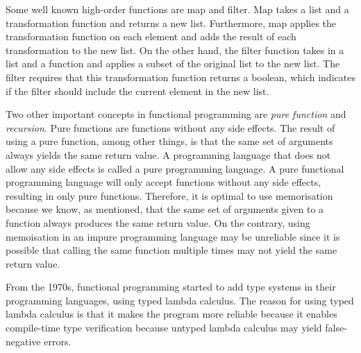 \para
Some well known high-order functions are map and filter. Map takes a list and a transformation function and returns a new list. Furthermore, map applies the transformation function on each element and adds the result of each transformation to the new list. On the other hand, the filter function takes in a list and a function and applies a subset of the original list to the new list. The filter requires that this transformation function returns a boolean, which indicates if the filter should include the current element in the new list.

\para
Two other important concepts in functional programming are \emph{pure function} and \emph{recursion}. Pure functions are functions without any side effects. The result of using a pure function, among other things, is that the same set of arguments always yields the same return value. A programming language that does not allow any side effects is called a pure programming language. A pure functional programming language will only accept functions without any side effects, resulting in only pure functions. Therefore, it is optimal to use memorisation because we know, as mentioned, that the same set of arguments given to a function always produces the same return value. On the contrary, using memoisation in an impure programming language may be unreliable since it is possible that calling the same function multiple times may not yield the same return value. 

\para
From the 1970s, functional programming started to add type systems in their programming languages, using typed lambda calculus. The reason for using typed lambda calculus is that it makes the program more reliable because it enables compile-time type verification because untyped lambda calculus may yield false-negative errors. 